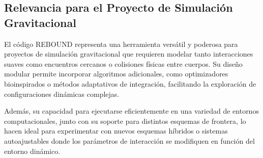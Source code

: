 \subsection{Relevancia para el Proyecto de Simulación Gravitacional}

El código REBOUND representa una herramienta versátil y poderosa para proyectos de simulación gravitacional que requieren modelar tanto interacciones suaves como encuentros cercanos o colisiones físicas entre cuerpos. Su diseño modular permite incorporar algoritmos adicionales, como optimizadores bioinspirados o métodos adaptativos de integración, facilitando la exploración de configuraciones dinámicas complejas.

Además, su capacidad para ejecutarse eficientemente en una variedad de entornos computacionales, junto con su soporte para distintos esquemas de frontera, lo hacen ideal para experimentar con nuevos esquemas híbridos o sistemas autoajustables donde los parámetros de interacción se modifiquen en función del entorno dinámico.

